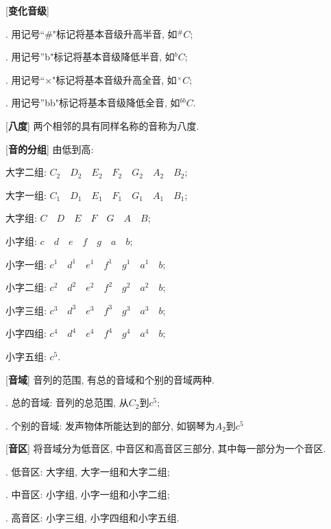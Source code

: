 [\textbf{变化音级}] \par
{}. 用记号``\#"标记将基本音级升高半音, 如$^\# C$;\par
{}. 用记号''b"标记将基本音级降低半音, 如$^b C$;\par
{}. 用记号``$\times$"标记将基本音级升高全音, 如$^\times C$;\par
{}. 用记号''bb"标记将基本音级降低全音, 如$^{bb} C$.\par

[\textbf{八度}] 两个相邻的具有同样名称的音称为八度.\par

\clearpage

[\textbf{音的分组}] 由低到高:\par
\qquad 大字二组: $C_2\quad D_2\quad E_2\quad F_2\quad G_2\quad A_2\quad B_2$;\par
\qquad 大字一组: $C_1\quad D_1\quad E_1\quad F_1\quad G_1\quad A_1\quad B_1$;\par
\qquad 大字组: \quad $C\quad D\quad E\quad F\quad G\quad A\quad B$;\par
\qquad 小字组: \quad $c\quad d\quad e\quad f\quad g\quad a\quad b$;\par
\qquad 小字一组: $c^1\quad d^1\quad e^1\quad f^1\quad g^1\quad a^1\quad b$;\par
\qquad 小字二组: $c^2\quad d^2\quad e^2\quad f^2\quad g^2\quad a^2\quad b$;\par
\qquad 小字三组: $c^3\quad d^3\quad e^3\quad f^3\quad g^3\quad a^3\quad b$;\par
\qquad 小字四组: $c^4\quad d^4\quad e^4\quad f^4\quad g^4\quad a^4\quad b$;\par
\qquad 小字五组: $c^5$.\par

[\textbf{音域}] 音列的范围, 有总的音域和个别的音域两种.\par
{}. 总的音域: 音列的总范围, 从$C_2$到$c^5$;\par
{}. 个别的音域: 发声物体所能达到的部分, 如钢琴为$A_2$到$c^5$

[\textbf{音区}] 将音域分为低音区, 中音区和高音区三部分, 其中每一部分为一个音区.\par
{}. 低音区: 大字组, 大字一组和大字二组;\par
{}. 中音区: 小字组, 小字一组和小字二组;\par
{}. 高音区: 小字三组, 小字四组和小字五组.\par


